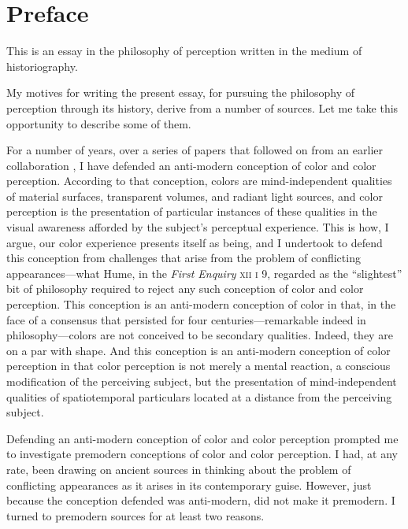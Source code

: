 \chapter*{Preface} %
\label{cha:preface}


This is an essay in the philosophy of perception written in the medium of historiography. 

My motives for writing the present essay, for pursuing the philosophy of perception through its history, derive from a number of sources. Let me take this opportunity to describe some of them.

For a number of years, over a series of papers \citep{Kalderon:2006tg,Kalderon:2008fk,Kalderon:2007mr,Kalderon:2010fj,Kalderon:2011fk} that followed on from an earlier collaboration \citep{Hilbert:2000on}, I have defended an anti-modern conception of color and color perception. According to that conception, colors are mind-independent qualities of material surfaces, transparent volumes, and radiant light sources, and color perception is the presentation of particular instances of these qualities in the visual awareness afforded by the subject's perceptual experience. This is how, I argue, our color experience presents itself as being, and I undertook to defend this conception from challenges that arise from the problem of conflicting appearances---what Hume, in the \emph{First Enquiry} \textsc{xii} \textsc{i} 9, regarded as the ``slightest'' bit of philosophy required to reject any such conception of color and color perception. This conception is an anti-modern conception of color in that, in the face of a consensus that persisted for four centuries---remarkable indeed in philosophy---colors are not conceived to be secondary qualities. Indeed, they are on a par with shape. And this conception is an anti-modern conception of color perception in that color perception is not merely a mental reaction, a conscious modification of the perceiving subject, but the presentation of mind-independent qualities of spatiotemporal particulars located at a distance from the perceiving subject. 

Defending an anti-modern conception of color and color perception prompted me to investigate premodern conceptions of color and color perception. I had, at any rate, been drawing on ancient sources in thinking about the problem of conflicting appearances as it arises in its contemporary guise. However, just because the conception defended was anti-modern, did not make it premodern. I turned to premodern sources for at least two reasons. 

